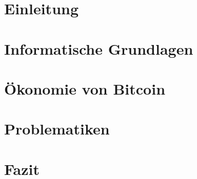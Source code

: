 \chapter{Einleitung}

\chapter{Informatische Grundlagen}



\chapter{Ökonomie von Bitcoin}



\chapter{Problematiken}


\chapter{Fazit}

